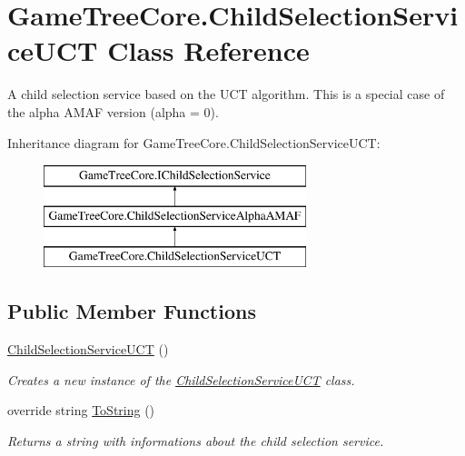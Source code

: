 \hypertarget{class_game_tree_core_1_1_child_selection_service_u_c_t}{}\section{Game\+Tree\+Core.\+Child\+Selection\+Service\+U\+CT Class Reference}
\label{class_game_tree_core_1_1_child_selection_service_u_c_t}


A child selection service based on the U\+CT algorithm. This is a special case of the alpha A\+M\+AF version (alpha = 0).  


Inheritance diagram for Game\+Tree\+Core.\+Child\+Selection\+Service\+U\+CT\+:\begin{figure}[H]
\begin{center}
\leavevmode
\includegraphics[height=3.000000cm]{class_game_tree_core_1_1_child_selection_service_u_c_t}
\end{center}
\end{figure}
\subsection*{Public Member Functions}
\begin{DoxyCompactItemize}
\item 
\mbox{\hyperlink{class_game_tree_core_1_1_child_selection_service_u_c_t_ad649e695f196bc3e4c3899aa591a9aee}{Child\+Selection\+Service\+U\+CT}} ()
\begin{DoxyCompactList}\small\item\em Creates a new instance of the \mbox{\hyperlink{class_game_tree_core_1_1_child_selection_service_u_c_t}{Child\+Selection\+Service\+U\+CT}} class. \end{DoxyCompactList}\item 
override string \mbox{\hyperlink{class_game_tree_core_1_1_child_selection_service_u_c_t_abbd068c35c9e9b2fd596b80a16c660fa}{To\+String}} ()
\begin{DoxyCompactList}\small\item\em Returns a string with informations about the child selection service. \end{DoxyCompactList}\end{DoxyCompactItemize}


